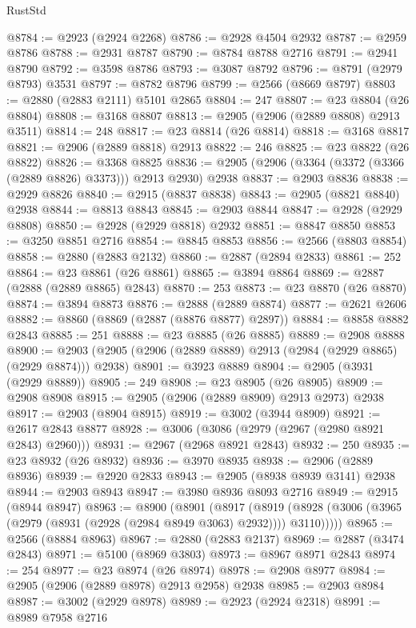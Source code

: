 \begin{lexlean}{RustStd}
\begin{coremodule}
{\begin{coremodule}
{{{{{{{{{{{{{{{{{{{{{{{{{{{{{{{{{{{{{{{{{{{{{{{{{{{{{{{{{{{{{{{{{{{{{{{{{{{{{{@8784 := @2923 (@2924 @2268)
@8786 := @2928 @4504 @2932
@8787 := @2959 @8786
@8788 := @2931 @8787
@8790 := @8784 @8788 @2716
@8791 := @2941 @8790
@8792 := @3598 @8786
@8793 := @3087 @8792
@8796 := @8791 (@2979 @8793) @3531
@8797 := @8782 @8796
@8799 := @2566 (@8669 @8797)
@8803 := @2880 (@2883 @2111) @5101 @2865
@8804 := 247
@8807 := @23 @8804 (@26 @8804)
@8808 := @3168 @8807
@8813 := @2905 (@2906 (@2889 @8808) @2913 @3511)
@8814 := 248
@8817 := @23 @8814 (@26 @8814)
@8818 := @3168 @8817
@8821 := @2906 (@2889 @8818) @2913
@8822 := 246
@8825 := @23 @8822 (@26 @8822)
@8826 := @3368 @8825
@8836 := @2905 (@2906 (@3364 (@3372 (@3366 (@2889 @8826) @3373))) @2913 @2930) @2938
@8837 := @2903 @8836
@8838 := @2929 @8826
@8840 := @2915 (@8837 @8838)
@8843 := @2905 (@8821 @8840) @2938
@8844 := @8813 @8843
@8845 := @2903 @8844
@8847 := @2928 (@2929 @8808)
@8850 := @2928 (@2929 @8818) @2932
@8851 := @8847 @8850
@8853 := @3250 @8851 @2716
@8854 := @8845 @8853
@8856 := @2566 (@8803 @8854)
@8858 := @2880 (@2883 @2132)
@8860 := @2887 (@2894 @2833)
@8861 := 252
@8864 := @23 @8861 (@26 @8861)
@8865 := @3894 @8864
@8869 := @2887 (@2888 (@2889 @8865) @2843)
@8870 := 253
@8873 := @23 @8870 (@26 @8870)
@8874 := @3894 @8873
@8876 := @2888 (@2889 @8874)
@8877 := @2621 @2606
@8882 := @8860 (@8869 (@2887 (@8876 @8877) @2897))
@8884 := @8858 @8882 @2843
@8885 := 251
@8888 := @23 @8885 (@26 @8885)
@8889 := @2908 @8888
@8900 := @2903 (@2905 (@2906 (@2889 @8889) @2913 (@2984 (@2929 @8865) (@2929 @8874))) @2938)
@8901 := @3923 @8889
@8904 := @2905 (@3931 (@2929 @8889))
@8905 := 249
@8908 := @23 @8905 (@26 @8905)
@8909 := @2908 @8908
@8915 := @2905 (@2906 (@2889 @8909) @2913 @2973) @2938
@8917 := @2903 (@8904 @8915)
@8919 := @3002 (@3944 @8909)
@8921 := @2617 @2843 @8877
@8928 := @3006 (@3086 (@2979 (@2967 (@2980 @8921 @2843) @2960)))
@8931 := @2967 (@2968 @8921 @2843)
@8932 := 250
@8935 := @23 @8932 (@26 @8932)
@8936 := @3970 @8935
@8938 := @2906 (@2889 @8936)
@8939 := @2920 @2833
@8943 := @2905 (@8938 @8939 @3141) @2938
@8944 := @2903 @8943
@8947 := @3980 @8936 @8093 @2716
@8949 := @2915 (@8944 @8947)
@8963 := @8900
    (@8901
      (@8917
        (@8919 (@8928 (@3006 (@3965 (@2979 (@8931 (@2928 (@2984 @8949 @3063) @2932)))) @3110)))))
@8965 := @2566 (@8884 @8963)
@8967 := @2880 (@2883 @2137)
@8969 := @2887 (@3474 @2843)
@8971 := @5100 (@8969 @3803)
@8973 := @8967 @8971 @2843
@8974 := 254
@8977 := @23 @8974 (@26 @8974)
@8978 := @2908 @8977
@8984 := @2905 (@2906 (@2889 @8978) @2913 @2958) @2938
@8985 := @2903 @8984
@8987 := @3002 (@2929 @8978)
@8989 := @2923 (@2924 @2318)
@8991 := @8989 @7958 @2716
}}}}}}}}}}}}}}}}}}}}}}}}}}}}}}}}}}}}}}}}}}}}}}}}}}}}}}}}}}}}}}}}}}}}}}}}}}}}}}
\end{coremodule}}
\end{coremodule}
\end{lexlean}
